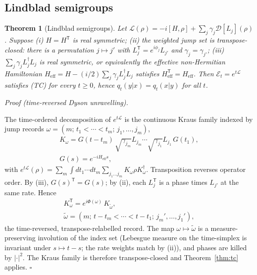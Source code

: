 \documentclass[aps,prx,reprint,floatfix,amsmath,amssymb,amsfonts]{revtex4-2}
\newtheorem{theorem}{Theorem}
\newenvironment{proof}[1][Proof]{%
  \par\medskip\noindent\textit{#1.}\ignorespaces
}{%
  \unskip\nobreak\hfill$\square$\par\medskip
}
\begin{document}
\subsection{Lindblad semigroups}

\begin{theorem}[Lindblad semigroups]
\label{thm:lindblad}
Let $\mathcal{L}(\rho) = -i[H,\rho] + \sum_j \gamma_j \mathcal{D}[L_j](\rho)$.
Suppose
(i) $H = H^{\mathsf T}$ is real symmetric;
(ii) the weighted jump set is transpose-closed: there is a permutation
$j \mapsto j'$ with $L_j^{\mathsf T} = e^{i\phi_j} L_{j'}$ and
$\gamma_j = \gamma_{j'}$;
(iii) $\sum_j \gamma_j L_j^\dagger L_j$ is real symmetric, or
equivalently the effective non-Hermitian Hamiltonian
$H_{\mathrm{eff}} = H - (i/2)\sum_j \gamma_j L_j^\dagger L_j$ satisfies
$H_{\mathrm{eff}}^{\mathsf T} = H_{\mathrm{eff}}$.
Then $\mathcal{E}_t = e^{t\mathcal{L}}$ satisfies (TC) for every
$t \ge 0$, hence $q_t(y|x) = q_t(x|y)$ for all $t$.
\end{theorem}

\begin{proof}[Proof (time-reversed Dyson unravelling)]
The time-ordered decomposition of $e^{t\mathcal{L}}$ is the continuous
Kraus family indexed by jump records
$\omega = (m;\, t_1 < \cdots < t_m;\, j_1,\ldots,j_m)$,
\begin{gather}
  K_\omega
  =
  G(t-t_m)\, \sqrt{\gamma_{j_m}} L_{j_m} \cdots \sqrt{\gamma_{j_1}} L_{j_1}\, G(t_1),
  \nonumber\\
  G(s) = e^{-i H_{\mathrm{eff}} s},
\end{gather}
with
$e^{t\mathcal{L}}(\rho) = \sum_m \int dt_1\cdots dt_m \sum_{j_1\ldots j_m} K_\omega \rho K_\omega^\dagger$.
Transposition reverses operator order. By (iii), $G(s)^{\mathsf T} = G(s)$;
by (ii), each $L_j^{\mathsf T}$ is a phase times $L_{j'}$ at the same
rate. Hence
\begin{gather}
  K_\omega^{\mathsf T}
  =
  e^{i\Phi(\omega)}\, K_{\tilde\omega},
  \nonumber\\
  \tilde\omega
  =
  (m;\, t-t_m < \cdots < t-t_1;\, j_m',\ldots,j_1'),
\end{gather}
the time-reversed, transpose-relabelled record. The map
$\omega \mapsto \tilde\omega$ is a measure-preserving involution of the
index set (Lebesgue measure on the time-simplex is invariant under
$s \mapsto t-s$; the rate weights match by (ii)), and phases are killed
by $|\cdot|^2$. The Kraus family is therefore transpose-closed and
Theorem~\ref{thm:tc} applies.
\end{proof}
\end{document}
